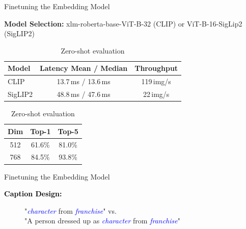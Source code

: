 \documentclass[aspectratio=169]{beamer}
\begin{document}
\begin{frame}{Finetuning the Embedding Model} %
   
    \textbf{Model Selection:} xlm-roberta-base-ViT-B-32 (CLIP) or ViT-B-16-SigLip2 (SigLIP2)

    \begin{table}[h]
        \centering
        \begin{minipage}[t]{0.48\textwidth}
            \centering
            \small
            \begin{tabular}{lcc}
            \toprule
            Model & Latency Mean / Median & Throughput \\
            \midrule
            CLIP & 13.7\,ms / 13.6\,ms & 119\,img/s \\
            SigLIP2 & 48.8\,ms / 47.6\,ms & 22\,img/s \\
            \bottomrule
            \end{tabular}
            \caption{Inference cost}
            \label{tab:runtime}
        \end{minipage}
        \hfill
        \begin{minipage}[t]{0.48\textwidth}
            \centering
            \small
            \begin{tabular}{ccc}
            \toprule
            Dim & Top-1 & Top-5 \\
            \midrule
            512 & 61.6\% & 81.0\% \\
            768 & 84.5\% & 93.8\% \\
            \bottomrule
            \end{tabular}
            \caption{Zero-shot evaluation}
            \label{tab:zeroshot-selection}
        \end{minipage}
    \end{table}
\end{frame}

\begin{frame}{Finetuning the Embedding Model} %
    \begin{description}
        \item[\textcolor{black}{\textbf{Caption Design:}}] "\textcolor{blue}{\textit{character}} from \textcolor{blue}{\textit{franchise}}" vs. \\
        \hspace{1.8em} "A person dressed up as \textcolor{blue}{\textit{character}} from \textcolor{blue}{\textit{franchise}}"
    \end{description}
\end{frame}
\end{document}
